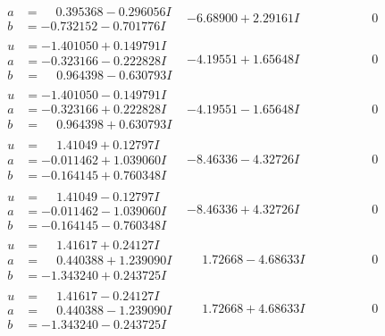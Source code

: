 \documentclass[1p]{elsarticle_modified}
\theoremstyle{definition}
\begin{document}
$$\begin{array}{c|c|c}
\begin{aligned}
a &= \phantom{-}0.395368 - 0.296056 I \\
b &= -0.732152 - 0.701776 I\end{aligned}
 & -6.68900 + 2.29161 I & \phantom{-0.000000 } 0 \\ \hline\begin{aligned}
u &= -1.401050 + 0.149791 I \\
a &= -0.323166 - 0.222828 I \\
b &= \phantom{-}0.964398 - 0.630793 I\end{aligned}
 & -4.19551 + 1.65648 I & \phantom{-0.000000 } 0 \\ \hline\begin{aligned}
u &= -1.401050 - 0.149791 I \\
a &= -0.323166 + 0.222828 I \\
b &= \phantom{-}0.964398 + 0.630793 I\end{aligned}
 & -4.19551 - 1.65648 I & \phantom{-0.000000 } 0 \\ \hline\begin{aligned}
u &= \phantom{-}1.41049 + 0.12797 I \\
a &= -0.011462 + 1.039060 I \\
b &= -0.164145 + 0.760348 I\end{aligned}
 & -8.46336 - 4.32726 I & \phantom{-0.000000 } 0 \\ \hline\begin{aligned}
u &= \phantom{-}1.41049 - 0.12797 I \\
a &= -0.011462 - 1.039060 I \\
b &= -0.164145 - 0.760348 I\end{aligned}
 & -8.46336 + 4.32726 I & \phantom{-0.000000 } 0 \\ \hline\begin{aligned}
u &= \phantom{-}1.41617 + 0.24127 I \\
a &= \phantom{-}0.440388 + 1.239090 I \\
b &= -1.343240 + 0.243725 I\end{aligned}
 & \phantom{-}1.72668 - 4.68633 I & \phantom{-0.000000 } 0 \\ \hline\begin{aligned}
u &= \phantom{-}1.41617 - 0.24127 I \\
a &= \phantom{-}0.440388 - 1.239090 I \\
b &= -1.343240 - 0.243725 I\end{aligned}
 & \phantom{-}1.72668 + 4.68633 I & \phantom{-0.000000 } 0\\

\end{array}$$
\end{document}
